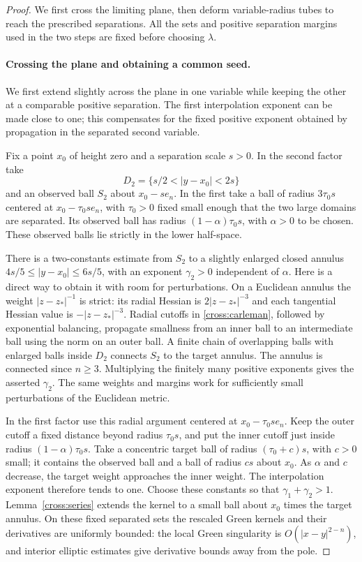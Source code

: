 \documentclass[11pt]{article}
\theoremstyle{definition}
\theoremstyle{remark}
\numberwithin{equation}{section}
\begin{document}
\begin{proof}
We first cross the limiting plane, then deform variable-radius tubes
to reach the prescribed separations.  All the sets and positive
separation margins used in the two steps are fixed before choosing
$\lambda$.

\paragraph{Crossing the plane and obtaining a common seed.}
We first extend slightly across the plane in one variable while keeping
the other at a comparable positive separation. The first interpolation
exponent can be made close to one; this compensates for the fixed
positive exponent obtained by propagation in the separated second
variable.

Fix a point $x_0$ of height zero and a separation scale $s>0$.
In the second factor take
\[
 D_2=\{s/2<|y-x_0|<2s\}
\]
and an observed ball $S_2$ about $x_0-se_n$.
In the first take a ball of radius $3\tau_0s$ centered at
$x_0-\tau_0se_n$, with $\tau_0>0$ fixed small enough that the two
large domains are separated.  Its observed ball has radius
$(1-\alpha)\tau_0s$, with $\alpha>0$ to be chosen.
These observed balls lie strictly in the lower half-space.

There is a two-constants estimate from $S_2$ to a slightly enlarged
closed annulus $4s/5\le|y-x_0|\le6s/5$, with an exponent
$\gamma_2>0$ independent of $\alpha$.  Here is a direct way to obtain
it with room for perturbations.  On a Euclidean annulus the weight
$|z-z_*|^{-1}$ is strict: its radial Hessian is
$2|z-z_*|^{-3}$ and each tangential Hessian value is
$-|z-z_*|^{-3}$.  Radial cutoffs in
\eqref{cross:carleman}, followed by exponential balancing, propagate
smallness from an inner ball to an intermediate ball using the norm
on an outer ball.  A finite chain of overlapping balls with enlarged
balls inside $D_2$ connects $S_2$ to the target annulus.  The annulus
is connected since $n\ge3$.  Multiplying the finitely many positive
exponents gives the asserted $\gamma_2$.  The same weights and margins
work for sufficiently small perturbations of the Euclidean metric.

In the first factor use this radial argument centered at
$x_0-\tau_0se_n$.  Keep the outer cutoff a fixed distance beyond radius
$\tau_0s$, and put the inner cutoff just inside radius
$(1-\alpha)\tau_0s$.  Take a concentric target ball of radius
$(\tau_0+c)s$, with $c>0$ small; it contains the observed ball and
a ball of radius $cs$ about $x_0$.
As $\alpha$ and $c$ decrease, the target weight approaches the inner weight.
The interpolation exponent therefore tends to one.  Choose these
constants so that $\gamma_1+\gamma_2>1$.
Lemma~\ref{cross:series} extends the kernel to a small ball about
$x_0$ times the target annulus.  On these fixed separated sets the
rescaled Green kernels and their derivatives are uniformly bounded:
the local Green singularity is $O(|x-y|^{2-n})$, and interior elliptic
estimates give derivative bounds away from the pole.


\end{proof}
\end{document}
